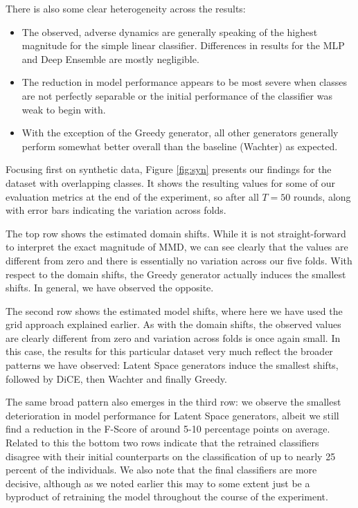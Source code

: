 \documentclass[conference,final,]{IEEEtran}
\providecommand{\tightlist}{%
  \setlength{\itemsep}{0pt}\setlength{\parskip}{0pt}}
\theoremstyle{definition}
\theoremstyle{definition}
\theoremstyle{definition}
\theoremstyle{definition}
\theoremstyle{remark}
\begin{document}
There is also some clear heterogeneity across the results:

\begin{itemize}
\tightlist
\item
  The observed, adverse dynamics are generally speaking of the highest magnitude for the simple linear classifier. Differences in results for the MLP and Deep Ensemble are mostly negligible.
\item
  The reduction in model performance appears to be most severe when classes are not perfectly separable or the initial performance of the classifier was weak to begin with.
\item
  With the exception of the Greedy generator, all other generators generally perform somewhat better overall than the baseline (Wachter) as expected.
\end{itemize}

Focusing first on synthetic data, Figure \ref{fig:syn} presents our findings for the dataset with overlapping classes. It shows the resulting values for some of our evaluation metrics at the end of the experiment, so after all \(T=50\) rounds, along with error bars indicating the variation across folds.

The top row shows the estimated domain shifts. While it is not straight-forward to interpret the exact magnitude of MMD, we can see clearly that the values are different from zero and there is essentially no variation across our five folds. With respect to the domain shifts, the Greedy generator actually induces the smallest shifts. In general, we have observed the opposite.

The second row shows the estimated model shifts, where here we have used the grid approach explained earlier. As with the domain shifts, the observed values are clearly different from zero and variation across folds is once again small. In this case, the results for this particular dataset very much reflect the broader patterns we have observed: Latent Space generators induce the smallest shifts, followed by DiCE, then Wachter and finally Greedy.

The same broad pattern also emerges in the third row: we observe the smallest deterioration in model performance for Latent Space generators, albeit we still find a reduction in the F-Score of around 5-10 percentage points on average. Related to this the bottom two rows indicate that the retrained classifiers disagree with their initial counterparts on the classification of up to nearly 25 percent of the individuals. We also note that the final classifiers are more decisive, although as we noted earlier this may to some extent just be a byproduct of retraining the model throughout the course of the experiment.
\end{document}
